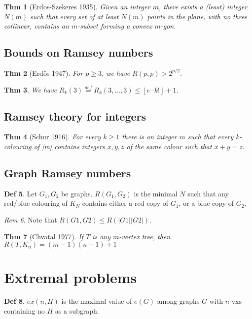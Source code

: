 \documentclass[11pt, fleqn, a4paper, landscape]{article}
\theoremstyle{plain} %
\newtheorem{thm}{Thm}
\theoremstyle{remark} %
\newtheorem{rem}[thm]{Rem}
\theoremstyle{definition} %
\newtheorem{defi}[thm]{Def}
\begin{document}
\begin{multicols}{5}
\begin{thm}[Erdos-Szekeres 1935]
Given an integer $m$, there exists a (least) integer $N(m)$ such
that every set of at least $N(m)$ points in the plane, with no three collinear, contains an $m$-subset forming a convex $m$-gon.
\end{thm}
\subsection{Bounds on Ramsey numbers}

\begin{thm}[Erdös 1947]
For $p \ge 3$, we have $R(p, p) > 2^{p/2}$.
\end{thm}

\begin{thm}
We have $R_k(3)\stackrel{def}{=}R_k(3,\dots,3)\le\left\lfloor e\cdot k!\right\rfloor+1$.
\end{thm}

\subsection{Ramsey theory for integers}

\begin{thm}[Schur 1916]
For every $k \ge 1$ there is an integer $m$ such that every $k$-colouring of [m] contains integers $x, y, z$ of the same colour such that $x + y = z.$
\end{thm}

\subsection{Graph Ramsey numbers}
\begin{defi}
Let $G_1,G_2$ be graphs. $R(G_1,G_2)$ is the minimal $N$ such that any red/blue colouring of $K_N$ contains either a red copy of $G_1$, or a blue copy of $G_2$.
\end{defi}

\begin{rem}
Note that $R(G1,G2) \le R(|G1||G2|)$.
\end{rem}

\begin{thm}[Chvatal 1977]
If $T$ is any $m$-vertex tree, then $R(T,K_n) = (m - 1)(n - 1) + 1$
\end{thm}

\section{Extremal problems}
\addtocounter{thm}{1}
\begin{defi}
$ex(n,H)$ is the maximal value of $e(G)$ among graphs $G$ with $n$ vxs containing no $H$ as a subgraph.
\end{defi}
\addtocounter{thm}{1}

\end{multicols}
\end{document}
